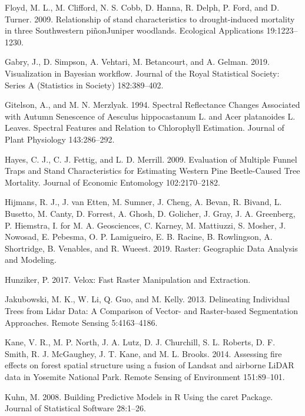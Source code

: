 \documentclass[]{article}
\begin{document}
\hypertarget{ref-floyd2009}{}
Floyd, M. L., M. Clifford, N. S. Cobb, D. Hanna, R. Delph, P. Ford, and
D. Turner. 2009. Relationship of stand characteristics to
drought-induced mortality in three Southwestern piñonJuniper woodlands.
Ecological Applications 19:1223--1230.

\hypertarget{ref-gabry2019}{}
Gabry, J., D. Simpson, A. Vehtari, M. Betancourt, and A. Gelman. 2019.
Visualization in Bayesian workflow. Journal of the Royal Statistical
Society: Series A (Statistics in Society) 182:389--402.

\hypertarget{ref-gitelson1994}{}
Gitelson, A., and M. N. Merzlyak. 1994. Spectral Reflectance Changes
Associated with Autumn Senescence of Aesculus hippocastanum L. and Acer
platanoides L. Leaves. Spectral Features and Relation to Chlorophyll
Estimation. Journal of Plant Physiology 143:286--292.

\hypertarget{ref-hayes2009}{}
Hayes, C. J., C. J. Fettig, and L. D. Merrill. 2009. Evaluation of
Multiple Funnel Traps and Stand Characteristics for Estimating Western
Pine Beetle-Caused Tree Mortality. Journal of Economic Entomology
102:2170--2182.

\hypertarget{ref-hijmans2019}{}
Hijmans, R. J., J. van Etten, M. Sumner, J. Cheng, A. Bevan, R. Bivand,
L. Busetto, M. Canty, D. Forrest, A. Ghosh, D. Golicher, J. Gray, J. A.
Greenberg, P. Hiemstra, I. for M. A. Geosciences, C. Karney, M.
Mattiuzzi, S. Mosher, J. Nowosad, E. Pebesma, O. P. Lamigueiro, E. B.
Racine, B. Rowlingson, A. Shortridge, B. Venables, and R. Wueest. 2019.
Raster: Geographic Data Analysis and Modeling.

\hypertarget{ref-hunziker2017}{}
Hunziker, P. 2017. Velox: Fast Raster Manipulation and Extraction.

\hypertarget{ref-jakubowski2013}{}
Jakubowski, M. K., W. Li, Q. Guo, and M. Kelly. 2013. Delineating
Individual Trees from Lidar Data: A Comparison of Vector- and
Raster-based Segmentation Approaches. Remote Sensing 5:4163--4186.

\hypertarget{ref-kane2014}{}
Kane, V. R., M. P. North, J. A. Lutz, D. J. Churchill, S. L. Roberts, D.
F. Smith, R. J. McGaughey, J. T. Kane, and M. L. Brooks. 2014. Assessing
fire effects on forest spatial structure using a fusion of Landsat and
airborne LiDAR data in Yosemite National Park. Remote Sensing of
Environment 151:89--101.

\hypertarget{ref-kuhn2008}{}
Kuhn, M. 2008. Building Predictive Models in R Using the caret Package.
Journal of Statistical Software 28:1--26.
\end{document}
